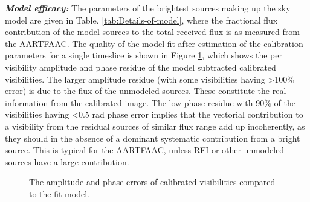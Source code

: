 \documentclass{aa}
\begin{document}
\textbf{\emph{Model efficacy:  }}The parameters of the  brightest sources making
up  the sky  model are  given  in Table.  \ref{tab:Details-of-model}, where  the
fractional flux contribution of the model  sources to the total received flux is
as measured from the AARTFAAC. The  quality of the model fit after estimation of
the  calibration  parameters   for  a  single  timeslice  is   shown  in  Figure
\ref{fig:The-model-amplitude},  which  shows the  per  visibility amplitude  and
phase  residue  of the  model  subtracted  calibrated  visibilities. The  larger
amplitude residue  (with some  visibilities having >100\%  error) is due  to the
flux of  the unmodeled sources. These  constitute the real  information from the
calibrated image.  The low  phase residue with  90\% of the  visibilities having
<0.5 rad  phase error  implies that the  vectorial contribution to  a visibility
from the  residual sources of  similar flux range  add up incoherently,  as they
should  in the  absence  of a  dominant  systematic contribution  from a  bright
source. This is typical for the  AARTFAAC, unless RFI or other unmodeled sources
have a large contribution.

\begin{figure}[tbh]

\caption{\label{fig:The-model-amplitude}The amplitude and phase errors of
calibrated visibilities compared to the fit model. }
\end{figure}
\end{document}
